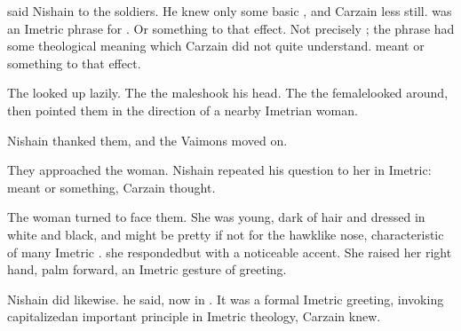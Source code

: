  said Nishain to the soldiers. 
He knew only some basic , and Carzain less still. 
 was an Imetric phrase for . 
Or something to that effect. 
Not precisely ; the phrase had some theological meaning which Carzain did not quite understand. 
 meant  or something to that effect. 


The \scathae{} looked up lazily. 
The \dax{}\dash the male\dash shook his head. 
The \sphyle\dash the female\dash looked around, then pointed them in the direction of a nearby Imetrian woman. 

Nishain thanked them, and the Vaimons moved on. 

They approached the woman. 
Nishain repeated his question to her in Imetric:  
 meant  or something, Carzain thought. 

The woman turned to face them. She was young, dark of hair and dressed in white and black, and might be pretty if not for the hawklike nose, characteristic of many Imetric \humans. 
 she responded\dash but with a noticeable accent. 
She raised her right hand, palm forward, an Imetric gesture of greeting. 

Nishain did likewise. 
 he said, now in \Velcadian{}. 
It was a formal Imetric greeting, invoking \dash{}capitalized\dash{}an important principle in Imetric theology, Carzain knew. 




